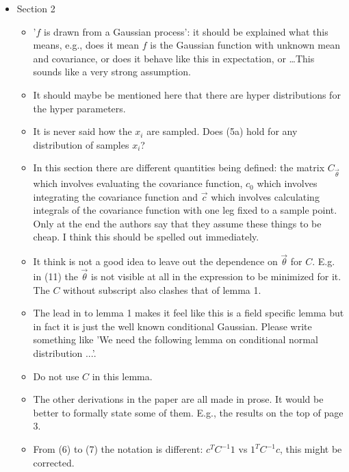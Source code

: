 \documentclass{amsart}
\begin{document}
\begin{itemize}
\item Section 2
\begin{itemize}
\item '$f$ is drawn from a Gaussian process': it should be explained what this
means, e.g., does it mean $f$ is the Gaussian function with unknown mean and
covariance, or does it behave like this in expectation, or \ldots This sounds like
a very strong assumption. 
\item It should maybe be mentioned here that there are hyper distributions for the
hyper parameters. 
\item It is never said how the $x_i$ are sampled. Does (5a) hold for any
distribution of samples $x_i$? 
\item In this section there are different quantities being defined: the matrix
$C_{\vec{\theta}}$ which involves evaluating the covariance function, $c_0$ which
involves integrating the covariance function and $\vec{c}$ which involves
calculating integrals of the covariance function with one leg fixed to a sample
point. Only at the end the authors say that they assume these things to be
cheap. I think this should be spelled out immediately. 
\item  It think is not a good idea to leave out the dependence on $\vec{\theta}$ for
$C$. E.g. in (11) the $\vec{\theta}$ is not visible at all in the expression to be
minimized for it. The $C$ without subscript also clashes that of lemma 1. 
\item  The lead in to lemma 1 makes it feel like this is a field specific lemma but
in fact it is just the well known conditional Gaussian. Please write something
like 'We need the following lemma on conditional normal distribution ...'.  
\item  Do not use $C$ in this lemma. 
\item  The other derivations in the paper are all made in prose. It would be better
to formally state some of them. E.g., the results on the top of page 3. 
\item  From (6) to (7) the notation is different: $c^T C^{-1} 1$ vs $1^T C^{-1} c$,
this might be corrected. 
\end{itemize}



\end{itemize}
\end{document}
